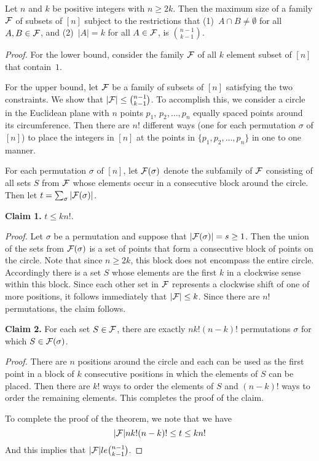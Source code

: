 \begin{theorem}
Let $n$ and $k$ be positive integers with $n\ge 2k$.  Then
the maximum size of a family $\mathcal{F}$ of subsets of $[n]$ subject to the
restrictions that (1)~$A\cap B\neq\emptyset$ for all $A,B\in\mathcal{F}$,
and (2)~$|A|=k$ for all $A\in\mathcal{F}$, is $\binom{n-1}{k-1}$.
\end{theorem}
\begin{proof}
For the lower bound, consider the family $\mathcal{F}$ of all $k$ element
subset of $[n]$ that contain~$1$. 

For the upper bound, let $\mathcal{F}$ be a family of subsets of $[n]$ 
satisfying the two constraints.  We show that $|\mathcal{F}|\le\binom{n-1}{k-1}$.
To accomplish this, we consider a circle in the Euclidean
plane with $n$ points $p_1$, $p_2,\dots,p_n$ equally
spaced points around its circumference.  Then there are
$n!$ different ways (one for each permutation $\sigma$ of $[n]$) 
to place the integers in $[n]$ at the points in $\{p_1,p_2,\dots,p_n\}$
in one to one manner.

For each permutation $\sigma$ of $[n]$, let $\mathcal{F}(\sigma)$ denote
the subfamily of $\mathcal{F}$ consisting of all sets $S$ from $\mathcal{F}$ whose
elements occur in a consecutive block around the circle.  Then
let $t=\sum_\sigma|\mathcal{F}(\sigma)|$.

\medskip
\noindent
\textbf{Claim 1.}\quad
$t\le kn!$.

\medskip
\noindent
\textit{Proof.}\quad
Let $\sigma$ be a permutation and suppose that
$|\mathcal{F}(\sigma)|=s \ge 1$. Then the union of the
sets from $\mathcal{F}(\sigma)$ is a set of points that form a
consecutive block of points on the circle.  Note that
since $n\ge 2k$, this block does not encompass the entire
circle.  Accordingly there is a set $S$ whose elements
are the first $k$ in a clockwise sense within this block.
Since each other set in $\mathcal{F}$ represents a clockwise shift
of one of more positions, it follows immediately that 
$|\mathcal{F}|\le k$.  Since there are $n!$ permutations, the
claim follows.

\medskip
\noindent
\textbf{Claim 2.}\quad
For each set $S\in\mathcal{F}$, there are exactly
$n k!(n-k)!$ permutations $\sigma$ for which $S\in\mathcal{F}(\sigma)$.

\medskip
\noindent
\textit{Proof.}\quad
There are $n$ positions around the circle and each can be used
as the first point in a block of $k$ consecutive positions in
which the elements of $S$ can be placed.  Then there are $k!$
ways to order the elements of $S$ and $(n-k)!$ ways to order
the remaining elements.  This completes the proof of the claim.

\medskip
To complete the proof of the theorem, we note that we have
\[
|\mathcal{F}| n k! (n-k)!\le t\le k n!
\]
And this implies that $|\mathcal{F}|le\binom{n-1}{k-1}$.
\end{proof}

